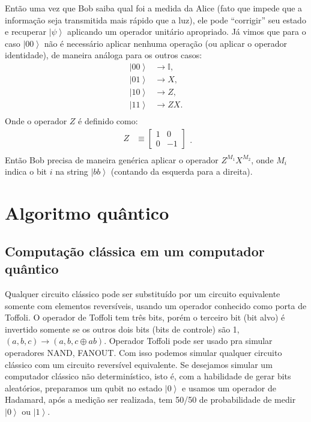 Então uma vez que Bob saiba qual foi a medida da Alice (fato que impede que a informação seja transmitida mais rápido que a luz), ele pode ``corrigir''  seu estado e recuperar $\left|\psi\right\rangle $ aplicando um operador unitário apropriado. Já vimos que para o caso $\left|00\right\rangle $ não é necessário aplicar nenhuma operação (ou aplicar o operador identidade), de maneira análoga para os outros casos:
\begin{equation}
\begin{split}
\left|00\right\rangle  & \rightarrow \mathbb{I}, \\
\left|01\right\rangle  & \rightarrow X, \\
\left|10\right\rangle  & \rightarrow Z,\\
\left|11\right\rangle  & \rightarrow ZX. \\
\end{split}
\end{equation}Onde o operador $Z$ é definido como:
\begin{equation}
\begin{split}
Z &\equiv\left[\begin{array}{cc}
1 & 0\\
0 & -1
\end{array}\right] \\
\end{split}
. \end{equation}
Então Bob precisa de maneira genérica aplicar o operador $Z^{M_{1}}X^{M_{2}}$, onde $M_i$ indica o bit $i$ na string $\left|bb\right\rangle $ (contando da esquerda para a direita). 

\section{Algoritmo quântico}

\subsection{Computação clássica em um computador quântico}

Qualquer circuito clássico pode ser substituído por um circuito equivalente somente com elementos reversíveis, usando um operador conhecido como porta de Toffoli. O operador de Toffoli tem três bits, porém o terceiro bit  (bit alvo)  é invertido somente se os outros dois bits  (bits de controle) são 1, $\left(a,b,c\right)\rightarrow\left(a,b,c\oplus ab\right)$.  Operador Toffoli pode ser usado pra simular operadores NAND, FANOUT.  Com isso podemos simular qualquer circuito clássico com um circuito reversível equivalente. Se desejamos simular um computador clássico não determinístico, isto é, com a habilidade de gerar bits aleatórios, preparamos um qubit no estado $\left|0\right\rangle $ e usamos um operador de Hadamard, após a medição ser realizada, tem 50/50 de probabilidade de medir $\left|0\right\rangle $ ou $\left|1\right\rangle $.

